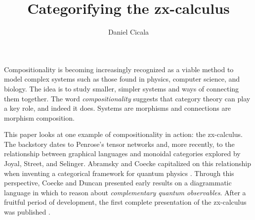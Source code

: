 \documentclass[submission,copyright,creativecommons]{eptcs}
\title{Categorifying the zx-calculus}
\author{Daniel Cicala
	\institute{Department of Mathematics\\
	University of California, Riverside\\
	USA}
	\email{cicala@math.ucr.edu}
}
\begin{document}
\maketitle


Compositionality is becoming increasingly recognized as a viable method to model complex systems such as those found in physics, computer science, and biology.  The idea is to study smaller, simpler systems and ways of connecting them together.  The word \emph{compositionality} suggests that category theory can play a key role, and indeed it does.  Systems are morphisms and connections are morphism composition.   

This paper \cite{CicalaCatZxCalc} looks at one example of compositionality in action: the zx-calculus.  The backstory dates to Penrose's tensor networks and, more recently, to the relationship between graphical languages and monoidal categories explored by Joyal, Street, and Selinger.  Abramsky and Coecke capitalized on this relationship when inventing a categorical framework for quantum physics \cite{AbramCoekeCatSemQuanProt}.  Through this perspective, Coecke and Duncan presented early results on a diagrammatic language in which to reason about \emph{complementary quantum observables}. After a fruitful period of development, the first complete presentation of the zx-calculus was published \cite{CoeckeDuncanInterQuanObs}. 
\end{document}
